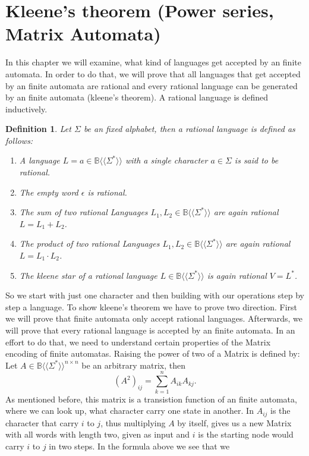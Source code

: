 \documentclass[12pt,letterpaper]{article}
\newtheorem{definition}{Definition}
\newcommand{\fps}[1] {
\mathbb{#1}\langle \langle \Sigma^* \rangle \rangle
}
\begin{document}
\section{Kleene's theorem (Power series, Matrix Automata)}
In this chapter we will examine, what kind of languages get accepted 
by an finite automata. In order to do that, we will prove that all
languages that get accepted by an finite automata are rational and every
rational language can be generated by an finite automata (kleene's theorem).
A rational language is defined inductively.
\begin{definition}
  Let $\Sigma$ be an fixed alphabet, then a rational language 
  is defined as follows:
  \begin{enumerate}
    \item A language $L = a \in \fps{B}$ with a single character 
      $a \in \Sigma$ is said to be rational.
    \item The empty word $\epsilon$ is rational.
    \item The sum of two rational Languages $L_1, L_2 \in \fps{B}$
      are again rational $L = L_1 + L_2$.
    \item The product of two rational Languages $L_1, L_2 \in \fps{B}$
      are again rational $L = L_1 \cdot L_2$.
    \item The kleene star of a rational language $L \in \fps{B}$ 
        is again rational $V = L^*$.
  \end{enumerate}
\end{definition}
So we start with just one character and then building with our operations
step by step  a language. To show kleene's theorem we have to prove two
direction. First we will prove that finite automata only accept rational 
languages. Afterwards, we will prove that every rational language is 
accepted by an finite automata. In an effort to do that, we need to 
understand certain properties of the Matrix encoding of finite automatas.
Raising the power of two of a Matrix is defined by:\\
Let $A \in \fps{B}^{n\times n}$ be an arbitrary matrix, then
\[ 
  (A^2)_{ij} = \sum_{k=1}^{n} A_{ik}A_{kj}.
\]
As mentioned before, this matrix is a transistion function of an finite
automata, where we can look up, what character carry one state in another.
In $A_{ij}$ is the character that carry $i$ to $j$, thus multiplying
$A$ by itself, gives us a new Matrix with all words with length two,
given as input and $i$ is the starting node would
carry $i$ to $j$ in two steps. In the formula above we see that we
\end{document}
